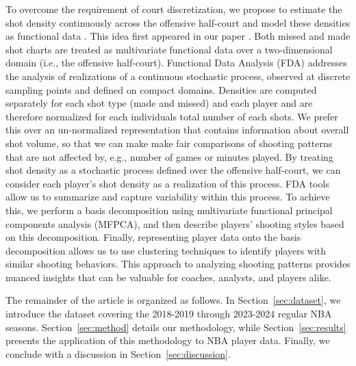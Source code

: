 To overcome the requirement of court discretization, we propose to estimate the shot density continuously across the offensive half-court and model these densities as functional data \citep{ramsayFunctionalDataAnalysis2005,kokoszkaIntroductionFunctionalData2017}.
This idea first appeared in our paper \cite{golovkineUseGramMatrix2024}. Both missed and made shot charts are treated as multivariate functional data over a two-dimensional domain (i.e., the offensive half-court). Functional Data Analysis (FDA) addresses the analysis of realizations of a continuous stochastic process, observed at discrete sampling points and defined on compact domains. 
Densities are computed separately for each shot type (made and missed) and each player and are therefore normalized for each individuals total number of each shots.
We prefer this over an un-normalized representation that contains information about overall shot volume, so that we can make make fair comparisons of shooting
patterns that are not affected by, e.g., number of games or minutes played.
By treating shot density as a stochastic process defined over the offensive half-court, we can consider each player’s shot density as a realization of this process. FDA tools allow us to summarize and capture variability within this process. To achieve this, we perform a basis decomposition using multivariate functional principal components analysis (MFPCA), and then describe players’ shooting styles based on this decomposition. Finally, representing player data onto the basis decomposition allows us to use clustering techniques to identify players with similar shooting behaviors. This approach to analyzing shooting patterns provides nuanced insights that can be valuable for coaches, analysts, and players alike.


The remainder of the article is organized as follows. In Section~\ref{sec:dataset}, we introduce the dataset covering the 2018-2019 through 2023-2024 regular NBA seasons. Section~\ref{sec:method} details our methodology, while Section~\ref{sec:results} presents the application of this methodology to NBA player data. Finally, we conclude with a discussion in Section~\ref{sec:discussion}.
